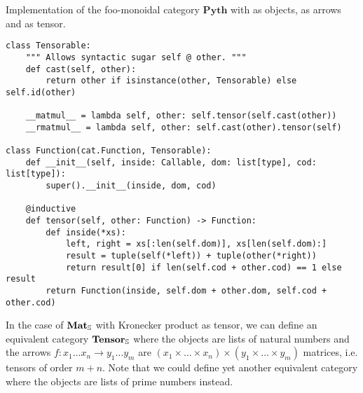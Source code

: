\begin{python}
{\normalfont Implementation of the foo-monoidal category $\mathbf{Pyth}$ with  as objects,  as arrows and  as tensor.}

\begin{verbatim}
class Tensorable:
    """ Allows syntactic sugar self @ other. """
    def cast(self, other):
        return other if isinstance(other, Tensorable) else self.id(other)

    __matmul__ = lambda self, other: self.tensor(self.cast(other))
    __rmatmul__ = lambda self, other: self.cast(other).tensor(self)

class Function(cat.Function, Tensorable):
    def __init__(self, inside: Callable, dom: list[type], cod: list[type]):
        super().__init__(inside, dom, cod)

    @inductive
    def tensor(self, other: Function) -> Function:
        def inside(*xs):
            left, right = xs[:len(self.dom)], xs[len(self.dom):]
            result = tuple(self(*left)) + tuple(other(*right))
            return result[0] if len(self.cod + other.cod) == 1 else result
        return Function(inside, self.dom + other.dom, self.cod + other.cod)
\end{verbatim}
\end{python}

In the case of $\mathbf{Mat}_\S$ with Kronecker product as tensor, we can define an equivalent category $\mathbf{Tensor}_\S$ where the objects are lists of natural numbers and the arrows $f : x_1 \dots x_n \to y_1 \dots y_m$ are $(x_1 \times \dots \times x_n) \times (y_1 \times \dots \times y_m)$ matrices, i.e. tensors of order $m + n$.
Note that we could define yet another equivalent category where the objects are lists of prime numbers instead.

